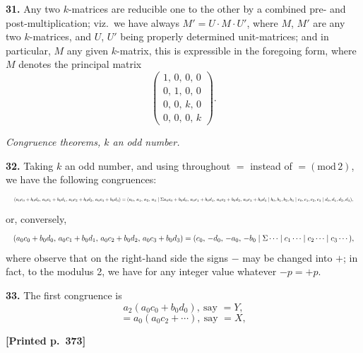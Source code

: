 \documentclass[11pt]{article}
\providecommand{\modd}{\mathrm{mod}}
\begin{document}
\medskip
\noindent\textbf{31.} Any two $k$-matrices are reducible one to the other by a combined pre- and post-multiplication; viz.\ we have always $M'=U\cdot M\cdot U'$, where $M$, $M'$ are any two $k$-matrices, and $U$, $U'$ being properly determined unit-matrices; and in particular, $M$ any given $k$-matrix, this is expressible in the foregoing form, where $M$ denotes the principal matrix
\[
\begin{pmatrix}1,\,0,\,0,\,0\\ 0,\,1,\,0,\,0\\ 0,\,0,\,k,\,0\\ 0,\,0,\,0,\,k\end{pmatrix}.
\]

\medskip
\begin{center}\textit{Congruence theorems, $k$ an odd number.}\end{center}

\noindent\textbf{32.} Taking $k$ an odd number, and using throughout $=$ instead of $=(\modd\,2)$, we have the following congruences:
\[
\resizebox{\textwidth}{!}{$\displaystyle
(a_{0}c_{0}+b_{0}d_{0},\,a_{0}c_{1}+b_{0}d_{1},\,a_{0}c_{2}+b_{0}d_{2},\,a_{0}c_{3}+b_{0}d_{3})
=(a_{0},\,a_{1},\,a_{2},\,a_{3}\mid \Sigma a_{0}c_{0}+b_{0}d_{0},\,a_{0}c_{1}+b_{0}d_{1},\,a_{0}c_{2}+b_{0}d_{2},\,a_{0}c_{3}+b_{0}d_{3}\mid b_{0},b_{1},b_{2},b_{3}\mid c_{0},c_{1},c_{2},c_{3}\mid d_{0},d_{1},d_{2},d_{3}),
$}
\]
or, conversely,
\[
\resizebox{\textwidth}{!}{$\displaystyle
(a_{0}c_{0}+b_{0}d_{0},\,a_{0}c_{1}+b_{0}d_{1},\,a_{0}c_{2}+b_{0}d_{2},\,a_{0}c_{3}+b_{0}d_{3})
=(c_{0},\,-d_{0},\,-a_{0},\,-b_{0}\mid \Sigma\cdots\mid c_{1}\cdots\mid c_{2}\cdots\mid c_{3}\cdots),
$}
\]
where observe that on the right-hand side the signs $-$ may be changed into $+$; in fact, to the modulus 2, we have for any integer value whatever $-p=+p$.

\medskip
\noindent\textbf{33.} The first congruence is
\[
a_{2}(a_{0}c_{0}+b_{0}d_{0}),\ \text{say }=Y,
\]
\[
=a_{0}(a_{0}c_{2}+\cdots),\ \text{say }=X,
\]

\medskip
\noindent\textbf{[Printed p.~373]}\hfill
\end{document}
